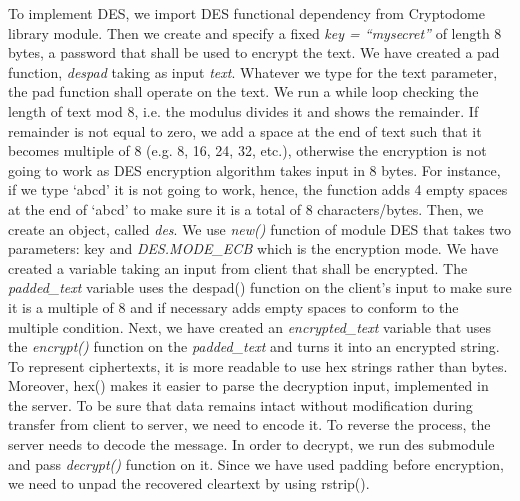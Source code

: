 To implement DES, we import DES functional dependency from Cryptodome library module. Then we create and specify a fixed \textit{key = “mysecret”} of length 8 bytes, a password that shall be used to encrypt the text. We have created a pad function, \textit{despad} taking as input \textit{text}. Whatever we type for the text parameter, the pad function shall operate on the text. We run a while loop checking the length of text mod 8, i.e. the modulus divides it and shows the remainder. If remainder is not equal to zero, we add a space at the end of text such that it becomes multiple of 8 (e.g. 8, 16, 24, 32, etc.), otherwise the encryption is not going to work as DES encryption algorithm takes input in 8 bytes. For instance, if we type ‘abcd’ it is not going to work, hence, the function adds 4 empty spaces at the end of ‘abcd’ to make sure it is a total of 8 characters/bytes. Then, we create an object, called \textit{des}. We use \textit{new()} function of module DES that takes two parameters: key and \textit{DES.MODE\_ECB} which is the encryption mode. We have created a variable taking an input from client that shall be encrypted. The \textit{padded\_text} variable uses the despad() function on the client's input to make sure it is a multiple of 8 and if necessary adds empty spaces to conform to the multiple condition. Next, we have created an \textit{encrypted\_text} variable that uses the \textit{encrypt()} function on the \textit{padded\_text} and turns it into an encrypted string. To represent ciphertexts, it is more readable to use hex strings rather than bytes. Moreover, hex() makes it easier to parse the decryption input, implemented in the server. To be sure that data remains intact without modification during transfer from client to server, we need to encode it. To reverse the process, the server needs to decode the message. In order to decrypt, we run des submodule and pass \textit{decrypt()} function on it. Since we have used padding before encryption, we need to unpad the recovered cleartext by using rstrip(). 

